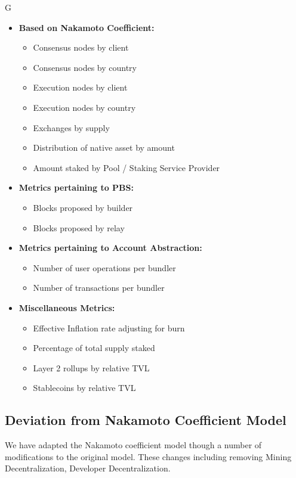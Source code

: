 G\documentclass[conference]{IEEEtran}
\begin{document}
\begin{itemize}
   \item \textbf{Based on Nakamoto Coefficient:}
   \begin{itemize}
     \item Consensus nodes by client
     \item Consensus nodes by country
     \item Execution nodes by client
     \item Execution nodes by country
     \item Exchanges by supply
     \item Distribution of native asset by amount
     \item Amount staked by Pool / Staking Service Provider
   \end{itemize}
   \item \textbf{Metrics pertaining to PBS:}
   \begin{itemize}
       \item Blocks proposed by builder
       \item Blocks proposed by relay
   \end{itemize}
   \item \textbf{Metrics pertaining to Account Abstraction:}
   \begin{itemize}
       \item Number of user operations per bundler
       \item Number of transactions per bundler
   \end{itemize}
   \item \textbf{Miscellaneous Metrics:}
   \begin{itemize}
       \item Effective Inflation rate adjusting for burn
       \item Percentage of total supply staked
       \item Layer 2 rollups by relative TVL
       \item Stablecoins by relative TVL
   \end{itemize}
 \end{itemize}

\subsection{Deviation from Nakamoto Coefficient Model}

We have adapted the Nakamoto coefficient model though a number of modifications to the original model.  These changes including removing Mining Decentralization, Developer Decentralization. 
\end{document}
